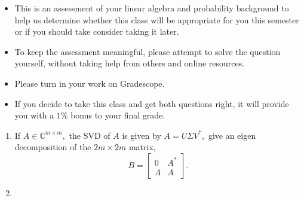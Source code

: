 \documentclass[12pt]{article}
\begin{document}
\MakeScribeTop

\begin{itemize}
	\item This is an assessment of your linear algebra and probability background to help us determine whether this class will be appropriate for you this semester or if you should take consider taking it later.
	\item To keep the assessment meaningful, please attempt to solve the question yourself, without taking help from others and online resources.
	\item Please turn in your work on Gradescope. 
	\item If you decide to take this class and get both questions right, it will provide you with a $1\%$ bonus to your final grade.
\end{itemize}

\begin{enumerate}
	\item If $A \in \mathbb{C}^{m\times m},$ the SVD of $A$ is given by $A = U \Sigma V^*,$ give an eigen decomposition of the $2m \times 2m$ matrix,
		\begin{equation}
		B = \begin{bmatrix}
		0 & A^* \\
		A & A
		\end{bmatrix}.
		\end{equation}
	\item  
\end{enumerate}



\end{document}
